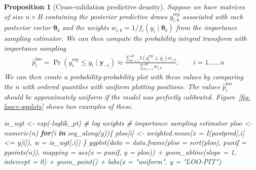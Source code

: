 \documentclass[
  11pt,
  letterpaper,
]{scrbook}
\newenvironment{Shaded}{\begin{snugshade}}{\end{snugshade}}
\newcommand{\AttributeTok}[1]{\textcolor[rgb]{0.40,0.45,0.13}{#1}}
\newcommand{\CommentTok}[1]{\textcolor[rgb]{0.37,0.37,0.37}{#1}}
\newcommand{\ControlFlowTok}[1]{\textcolor[rgb]{0.00,0.23,0.31}{\textbf{#1}}}
\newcommand{\DecValTok}[1]{\textcolor[rgb]{0.68,0.00,0.00}{#1}}
\newcommand{\FunctionTok}[1]{\textcolor[rgb]{0.28,0.35,0.67}{#1}}
\newcommand{\NormalTok}[1]{\textcolor[rgb]{0.00,0.23,0.31}{#1}}
\newcommand{\OtherTok}[1]{\textcolor[rgb]{0.00,0.23,0.31}{#1}}
\newcommand{\SpecialCharTok}[1]{\textcolor[rgb]{0.37,0.37,0.37}{#1}}
\newcommand{\StringTok}[1]{\textcolor[rgb]{0.13,0.47,0.30}{#1}}
\theoremstyle{definition}
\theoremstyle{plain}
\theoremstyle{plain}
\theoremstyle{plain}
\newtheorem{proposition}{Proposition}[chapter]
\theoremstyle{definition}
\theoremstyle{definition}
\theoremstyle{remark}
\begin{document}
\begin{proposition}[Cross-validation predictive
density]
Suppose we have matrices of size \(n \times B\) containing the posterior
predictive draws \(y_{i,b}^{\mathrm{rep}}\) associated with each
posterior vector \(\boldsymbol{\theta}_b\) and the weights
\(w_{i,b} = 1/f_i (y_i \mid \boldsymbol{\theta}_b)\) from the importance
sampling estimator. We can then compute the probability integral
transform with importance sampling \begin{align*}
\widehat{p}_i^{\mathrm{loo}} = \Pr(y_i^{\mathrm{rep}} \leq y_i \mid \boldsymbol{y}_{-i}) \approx \frac{\sum_{b=1}^B \mathrm{I}(y_i^{\mathrm{rep}} \leq y_i)w_{i,b}}{\sum_{b=1}^B w_{i,b}}, \qquad i =1,\ldots, n
\end{align*} We can then create a probability-probability plot with
these values by comparing the \(n\) with ordered quantiles with uniform
plotting positions. The values \(\widehat{p}_i^{\mathrm{loo}}\) should
be approximately uniform if the model was perfectly calibrated.
Figure~\ref{fig-loocv-qqplots} shows two examples of these.

\begin{Shaded}
\begin{Highlighting}[]
\NormalTok{is\_wgt }\OtherTok{\textless{}{-}} \FunctionTok{exp}\NormalTok{(}\SpecialCharTok{{-}}\NormalTok{loglik\_pt) }\CommentTok{\# log weights}
\CommentTok{\# importance sampling estimator}
\NormalTok{ploo }\OtherTok{\textless{}{-}} \FunctionTok{numeric}\NormalTok{(n)}
\ControlFlowTok{for}\NormalTok{(i }\ControlFlowTok{in} \FunctionTok{seq\_along}\NormalTok{(y))\{}
\NormalTok{ ploo[i] }\OtherTok{\textless{}{-}} \FunctionTok{weighted.mean}\NormalTok{(}\AttributeTok{x =} \FunctionTok{I}\NormalTok{(postpred[,i] }\SpecialCharTok{\textless{}=}\NormalTok{ y[i]), }\AttributeTok{w =}\NormalTok{ is\_wgt[,i])}
\NormalTok{\}}
\FunctionTok{ggplot}\NormalTok{(}\AttributeTok{data =} \FunctionTok{data.frame}\NormalTok{(}\AttributeTok{ploo =} \FunctionTok{sort}\NormalTok{(ploo), }\AttributeTok{punif =} \FunctionTok{ppoints}\NormalTok{(n)),}
       \AttributeTok{mapping =} \FunctionTok{aes}\NormalTok{(}\AttributeTok{x =}\NormalTok{ punif, }\AttributeTok{y =}\NormalTok{ ploo)) }\SpecialCharTok{+}
  \FunctionTok{geom\_abline}\NormalTok{(}\AttributeTok{slope =} \DecValTok{1}\NormalTok{, }\AttributeTok{intercept =} \DecValTok{0}\NormalTok{) }\SpecialCharTok{+} 
  \FunctionTok{geom\_point}\NormalTok{() }\SpecialCharTok{+}
  \FunctionTok{labs}\NormalTok{(}\AttributeTok{x =} \StringTok{"uniform"}\NormalTok{, }\AttributeTok{y =} \StringTok{"LOO{-}PIT"}\NormalTok{)}
\end{Highlighting}
\end{Shaded}


\end{proposition}
\end{document}
